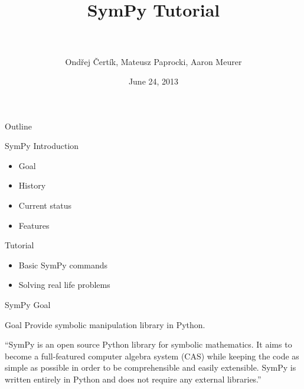 \documentclass[xcolor=svgnames]{beamer}
\title[SymPy\hspace{4em}\insertframenumber/
\inserttotalframenumber]{~\\ SymPy Tutorial \\~}
\author[O. Čertík, M. Paprocki, A. Meurer]
{Ondřej Čertík, Mateusz Paprocki, Aaron Meurer}
\institute{\pgfuseimage{mylogo}}
\date{June 24, 2013}
\begin{document}
\begin{frame}
  \maketitle
\end{frame}

\begin{frame}{Outline}
  \begin{block}{SymPy Introduction}
    \begin{itemize}
    \item Goal
    \item History
    \item Current status
    \item Features
    \end{itemize}
  \end{block}

  \begin{block}{Tutorial}
    \begin{itemize}
    \item Basic SymPy commands
    \item Solving real life problems
    \end{itemize}
  \end{block}
\end{frame}

\begin{frame}{SymPy Goal}
  \begin{block}{Goal}
    Provide symbolic manipulation library in Python.
  \end{block}
  \pause
  \begin{block}

    ``SymPy is an open source Python library for symbolic mathematics. It aims to
    become a full-featured computer algebra system (CAS) while keeping the code as
    simple as possible in order to be comprehensible and easily extensible. SymPy
    is written entirely in Python and does not require any external libraries.''

  \end{block}
\end{frame}
\end{document}
